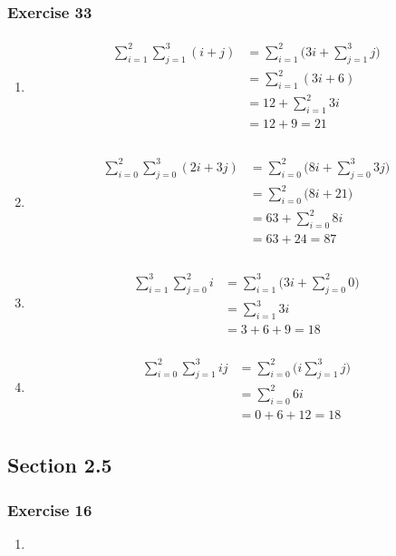 \documentclass[a4paper]{article}
\newcommand{\ex}[1]{\subsubsection*{#1}}
\newcommand{\eqns}[1]{
    \begin{align}
        \begin{split} \nonumber
            #1
        \end{split}
    \end{align}
}
\begin{document}
\ex{Exercise 33}
\begin{enumerate}[label=\alph*)]
    \item \eqns {
            \sum_{i=1}^2{\sum_{j=1}^{3}{(i+j)}} &= 
                \sum_{i=1}^2{ \big( 3i + \sum_{j=1}^3{ j } \big) }\\
            &= \sum_{i=1}^2{ (3i + 6) }\\
            &= 12 + \sum_{i=1}^2{ 3i  }\\
            &= 12 + 9 = 21\\
    }

    \item \eqns { 
            \sum_{i=0}^2{\sum_{j=0}^{3}{(2i+3j)}} &= 
                \sum_{i=0}^2{ \big( 8i + \sum_{j=0}^3{ 3j } \big) }\\
            &= \sum_{i=0}^2{ \big( 8i + 21 \big) }\\
            &= 63 + \sum_{i=0}^2{  8i  }\\
            &= 63 + 24 = 87\\
    }

    \item \eqns {
            \sum_{i=1}^3{\sum_{j=0}^{2}{i}} &= 
                \sum_{i=1}^3{ \big( 3i + \sum_{j=0}^2{ 0 } \big) }\\
            &= \sum_{i=1}^3{  3i  }\\
            &= 3 + 6 + 9 = 18
    }

    \item \eqns {
            \sum_{i=0}^2{ \sum_{j=1}^3{  ij  } } &= 
                \sum_{i=0}^2{ \big( i \sum_{j=1}^3{ j } \big) } \\
            &= \sum_{i=0}^2{ 6i  } \\
            &= 0 + 6 + 12 = 18
    }

\end{enumerate}


\vspace{2em}
\subsection*{Section 2.5}
\vspace{1em}

\ex{Exercise 16}
\begin{enumerate}[label=\alph*)]
    \item{
    }
\end{enumerate}


%
\end{document}
